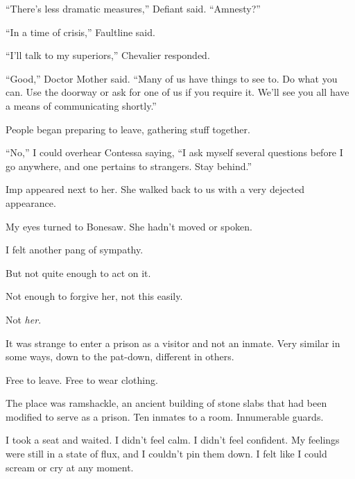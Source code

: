 ``There's less dramatic measures,'' Defiant said.  ``Amnesty?''



``In a time of crisis,'' Faultline said.



``I'll talk to my superiors,'' Chevalier responded.



``Good,'' Doctor Mother said.  ``Many of us have things to see to.  Do what you can.  Use the doorway or ask for one of us if you require it.  We'll see you all have a means of communicating shortly.''



People began preparing to leave, gathering stuff together.



``No,'' I could overhear Contessa saying, ``I ask myself several questions before I go anywhere, and one pertains to strangers.  Stay behind.''



Imp appeared next to her.  She walked back to us with a very dejected appearance.



My eyes turned to Bonesaw.  She hadn't moved or spoken.



I felt another pang of sympathy.



But not quite enough to act on it.



Not enough to forgive her, not this easily.



Not \emph{her}.



\sectionbreak



It was strange to enter a prison as a visitor and not an inmate.  Very similar in some ways, down to the pat-down, different in others.



Free to leave.  Free to wear clothing.



The place was ramshackle, an ancient building of stone slabs that had been modified to serve as a prison.  Ten inmates to a room.  Innumerable guards.



I took a seat and waited.  I didn't feel calm.  I didn't feel confident.  My feelings were still in a state of flux, and I couldn't pin them down.  I felt like I could scream or cry at any moment.




